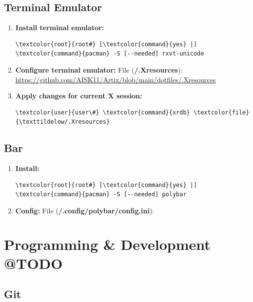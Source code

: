 \documentclass[10pt, a4paper, onecolumn, oneside, titlepage, openany]{book}
\begin{document}
\section{Terminal Emulator}
\begin{enumerate}
    \item \textbf{Install terminal emulator:}
\begin{Verbatim}[commandchars=\\\{\}]
\textcolor{root}{root#} [\textcolor{command}{yes} |] \textcolor{command}{pacman} -S [--needed] rxvt-unicode
\end{Verbatim}
    \item \textbf{Configure terminal emulator:}
\newline File (\textbf{\textcolor{file}{\texttildelow/.Xresources}}):
\newline \url{https://github.com/AISK11/Artix/blob/main/dotfiles/.Xresources}
    \item \textbf{Apply changes for current X session:}
\begin{Verbatim}[commandchars=\\\{\}]
\textcolor{user}{user\#} \textcolor{command}{xrdb} \textcolor{file}{\texttildelow/.Xresources}
\end{Verbatim}
\end{enumerate}

\section{Bar}
\begin{enumerate}
    \item \textbf{Install:}
\begin{Verbatim}[commandchars=\\\{\}]
\textcolor{root}{root#} [\textcolor{command}{yes} |] \textcolor{command}{pacman} -S [--needed] polybar
\end{Verbatim}
    \item \textbf{Config:}
\newline File (\textbf{\textcolor{file}{\texttildelow/.config/polybar/config.ini}}):
\end{enumerate}




\chapter{Programming \& Development @TODO}
\section{Git}
\end{document}
